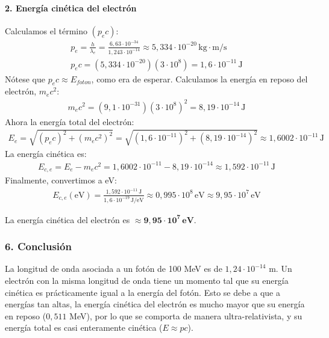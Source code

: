 \paragraph{2. Energía cinética del electrón}
Calculamos el término $(p_e c)$:
\begin{gather}
    p_e = \frac{h}{\lambda_e} = \frac{6,63 \cdot 10^{-34}}{1,243 \cdot 10^{-14}} \approx 5,334 \cdot 10^{-20} \, \text{kg}\cdot\text{m/s} \\
    p_e c = (5,334 \cdot 10^{-20})(3 \cdot 10^8) = 1,6 \cdot 10^{-11} \, \text{J}
\end{gather}
Nótese que $p_e c \approx E_{foton}$, como era de esperar.
Calculamos la energía en reposo del electrón, $m_e c^2$:
\begin{gather}
    m_e c^2 = (9,1 \cdot 10^{-31})(3 \cdot 10^8)^2 = 8,19 \cdot 10^{-14} \, \text{J}
\end{gather}
Ahora la energía total del electrón:
\begin{gather}
    E_e = \sqrt{(p_e c)^2 + (m_e c^2)^2} = \sqrt{(1,6 \cdot 10^{-11})^2 + (8,19 \cdot 10^{-14})^2} \approx 1,6002 \cdot 10^{-11} \, \text{J}
\end{gather}
La energía cinética es:
\begin{gather}
    E_{c,e} = E_e - m_e c^2 = 1,6002 \cdot 10^{-11} - 8,19 \cdot 10^{-14} \approx 1,592 \cdot 10^{-11} \, \text{J}
\end{gather}
Finalmente, convertimos a eV:
\begin{gather}
    E_{c,e} (\text{eV}) = \frac{1,592 \cdot 10^{-11} \, \text{J}}{1,6 \cdot 10^{-19} \, \text{J/eV}} \approx 0,995 \cdot 10^8 \, \text{eV} \approx 9,95 \cdot 10^7 \, \text{eV}
\end{gather}
\begin{cajaresultado}
    La energía cinética del electrón es $\boldsymbol{\approx 9,95 \cdot 10^7 \, \textbf{eV}}$.
\end{cajaresultado}

\subsubsection*{6. Conclusión}
\begin{cajaconclusion}
La longitud de onda asociada a un fotón de 100 MeV es de $1,24 \cdot 10^{-14}$ m. Un electrón con la misma longitud de onda tiene un momento tal que su energía cinética es prácticamente igual a la energía del fotón. Esto se debe a que a energías tan altas, la energía cinética del electrón es mucho mayor que su energía en reposo ($0,511$ MeV), por lo que se comporta de manera ultra-relativista, y su energía total es casi enteramente cinética ($E \approx pc$).
\end{cajaconclusion}

\newpage
